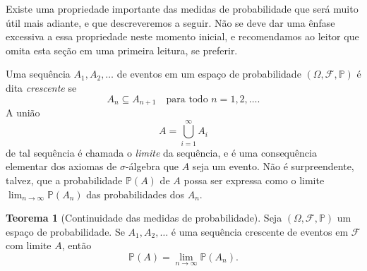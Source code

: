 \documentclass[12pt,portuguese]{article}
\theoremstyle{definition}
\newtheorem{theorem}{Teorema}
\begin{document}
Existe uma propriedade importante das medidas de probabilidade que será muito
útil mais adiante, e que descreveremos a seguir. Não se deve dar uma ênfase
excessiva a essa propriedade neste momento inicial, e recomendamos ao leitor
que omita esta seção em uma primeira leitura, se preferir.

Uma sequência \(A_1, A_2, \ldots\) de eventos em um espaço de probabilidade
\((\Omega, \mathcal{F}, \mathbb{P})\) é dita \emph{crescente} se
\[
A_n \subseteq A_{n+1} \quad \text{para todo } n = 1, 2, \ldots.
\]
A união
\[
A = \bigcup_{i=1}^{\infty} A_i
\]
de tal sequência é chamada o \emph{limite} da sequência, e é uma consequência
elementar dos axiomas de $\sigma$-álgebra que \(A\) seja um evento. Não é
surpreendente, talvez, que a probabilidade \(\mathbb{P}(A)\) de \(A\) possa ser
expressa como o limite \(\lim_{n \to \infty} \mathbb{P}(A_n)\) das
probabilidades dos \(A_n\).

\begin{theorem}[Continuidade das medidas de probabilidade]\label{thm:1.54}
Seja \((\Omega, \mathcal{F}, \mathbb{P})\) um espaço de probabilidade. Se
\(A_1, A_2, \ldots\) é uma sequência crescente de eventos em
\(\mathcal{F}\) com limite \(A\), então
\[
\mathbb{P}(A) = \lim_{n \to \infty} \mathbb{P}(A_n).
\]
\end{theorem}
\end{document}
